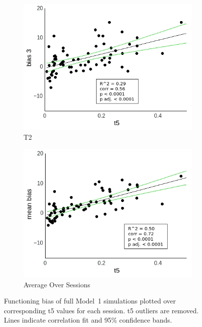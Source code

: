 \documentclass[a4paper]{scrreprt}
\begin{document}
\begin{figure}
\begin{subfigure}[b]{0.49\textwidth}
        \includegraphics[width=\textwidth]{figs/sec3/t5/t5no_diff_3_mod1mod1.jpeg}
        \caption{T2}
    \end{subfigure}
    \begin{subfigure}[b]{0.49\textwidth}
        \includegraphics[width=\textwidth]{figs/sec3/t5/t5no_diff_mean_mod1mod1.jpeg}
        \caption{Average Over Sessions}
    \end{subfigure}
\caption{Functioning bias of full Model~1 simulations plotted over corresponding t5 values for each session. t5 outliers are removed. Lines indicate correlation fit and 95\% confidence bands.}
\label{fig:t5no_diff_mod1mod1}
\end{figure}
\end{document}
